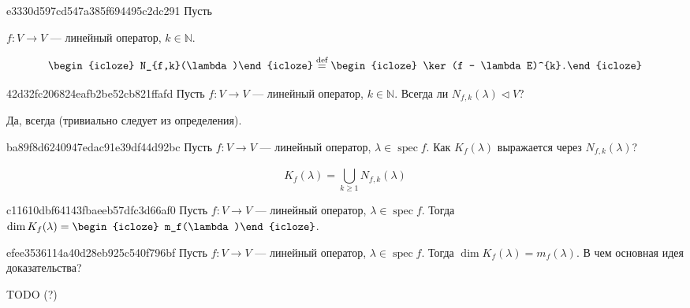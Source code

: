 \begin{note}{e3330d597cd547a385f694495c2dc291}
    Пусть \begin{icloze}{3}\( f : V \to V \) --- линейный оператор, \( k \in \mathbb N \).\end{icloze}
    \[
        \begin{icloze}{2}N_{f,k}(\lambda)\end{icloze} \overset{\text{def}}= \begin{icloze}{1}\ker (f - \lambda E)^{k}.\end{icloze}
    \]
\end{note}

\begin{note}{42d32fc206824eafb2be52cb821ffafd}
    Пусть \( f : V \to V \) --- линейный оператор, \( k \in \mathbb N \).
    Всегда ли \( N_{f,k}(\lambda) \triangleleft V \)?

    \begin{cloze}{1}
        Да, всегда (тривиально следует из определения).
    \end{cloze}
\end{note}

\begin{note}{ba89f8d6240947edac91e39df44d92bc}
    Пусть \( f : V \to V \) --- линейный оператор, \( \lambda \in \operatorname{spec} f \).
    Как \( K_f(\lambda) \) выражается через \( N_{f,k} (\lambda) \)?

    \begin{cloze}{1}
        \[
            K_f(\lambda) = \bigcup_{k \geqslant 1}^{} N_{f,k}(\lambda)
        \]
    \end{cloze}
\end{note}

\begin{note}{c11610dbf64143fbaeeb57dfc3d66af0}
    Пусть \( f : V \to V \) --- линейный оператор, \( \lambda \in \operatorname{spec} f \).
    Тогда \( \dim K_f(\lambda) = \begin{icloze}{1}m_f(\lambda)\end{icloze} \).
\end{note}

\begin{note}{efee3536114a40d28eb925c540f796bf}
    Пусть \( f : V \to V \) --- линейный оператор, \( \lambda \in \operatorname{spec} f \).
    Тогда \( \dim K_f(\lambda) = m_f(\lambda) \).
    В чем основная идея доказательства?

    TODO (?)
\end{note}

